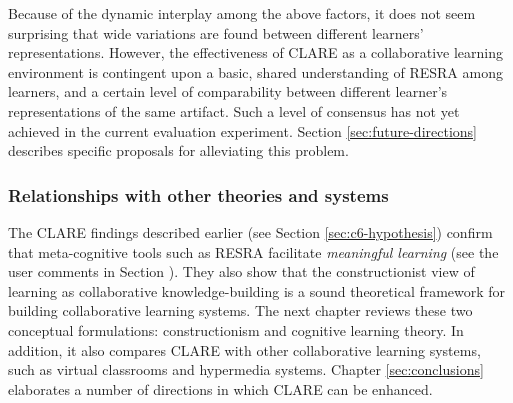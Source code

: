 Because of the dynamic interplay among the above factors, it does
not seem surprising that wide variations are found between different
learners' representations. However, the effectiveness of CLARE as a
collaborative learning environment is contingent upon a basic,
shared understanding of RESRA among learners, and a certain level of
comparability between different learner's representations of the same
artifact. Such a level of consensus has not yet achieved in the current
evaluation experiment. Section \ref{sec:future-directions} describes
specific proposals for alleviating this problem.


\subsubsection{Relationships with other theories and systems}

The CLARE findings described earlier (see Section \ref{sec:c6-hypothesis})
confirm that meta-cognitive tools such as RESRA facilitate {\it meaningful
learning\/} (see the user comments in Section ). They also show that the
constructionist view of learning as collaborative knowledge-building is a
sound theoretical framework for building collaborative learning
systems. The next chapter reviews these two conceptual formulations:
constructionism and cognitive learning theory. In addition, it also
compares CLARE with other collaborative learning systems, such as virtual
classrooms and hypermedia systems. Chapter \ref{sec:conclusions} elaborates
a number of directions in which CLARE can be enhanced.






